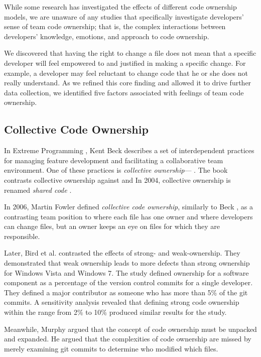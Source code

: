 While some research has investigated the effects of different code ownership models, we are unaware of any studies that specifically investigate developers’ sense of team code ownership; that is, the complex interactions between developers’ knowledge, emotions, and approach to code ownership.  

We discovered that having the right to change a file does not mean that a specific developer will feel empowered to and justified in making a specific change. For example, a developer may feel reluctant to change code that he or she does not really understand. As we refined this core finding and allowed it to drive further data collection, we identified five factors associated with feelings of team code ownership. 

\subsection{Collective Code Ownership}
In Extreme Programming \cite{BeckExtremeProgramming2004}, Kent Beck describes a set of interdependent practices for managing feature development and facilitating a collaborative team environment. One of these practices is \textit{collective ownership}--- \cite{BeckExtremeProgramming1999}. The book contrasts collective ownership against  and  In 2004, collective ownership is renamed \textit{shared code} \cite{BeckExtremeProgramming2004}.

In 2006, Martin Fowler defined \textit{collective code ownership}, similarly to Beck \cite{FowlerCodeOwnership}, as a contrasting team position to  where each file has one owner and  where developers can change files, but an owner keeps an eye on files for which they are responsible. 

Later, Bird et al. \cite{BirdDontTouchMyCode} contrasted the effects of strong- and weak-ownership. They demonstrated that weak ownership leads to more defects than strong ownership for Windows Vista and Windows 7. The study defined ownership for a software component as a percentage of the version control commits for a single developer. They defined a major contributor as someone who has more than 5\% of the git commits. A sensitivity analysis revealed that defining strong code ownership within the range from 2\% to 10\% produced similar results for the study.

Meanwhile, Murphy  \cite{MurphyIEEESoftware} argued that the concept of code ownership must be unpacked and expanded. He argued that the complexities of code ownership are missed by merely examining git commits to determine who modified which files.

